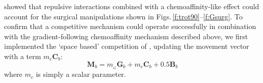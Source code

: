 \documentclass[11pt, a4paper]{article}
\begin{document}
\citet{simpson_simple_2011} showed that repulsive interactions combined with a
chemoaffinity-like effect could account for the surgical manipulations shown
in Figs.\,\ref{f:trot90}--\ref{f:Gsurg}. To confirm that a competitive
mechanism could operate successfully in combination with the
gradient-following chemoaffinity mechanism described above, we first
implemented the `space based' competition of \citet{simpson_simple_2011},
updating the movement vector with a term $m_c \mathbf{C}_b$:
\begin{equation} \label{e:mv2}
 \mathbf{M}_{b} = m_{\!_G} \mathbf{G}_b +  m_c \mathbf{C}_b + 0.5 \mathbf{B}_b
\end{equation}
where $m_c$ is simply a scalar parameter.
%
%
%
%
%
\end{document}
